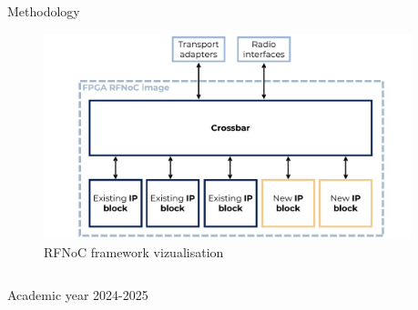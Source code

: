 \documentclass[final]{beamer}
\newlength{\sepwid}
\newlength{\onecolwid}
\begin{document}
\begin{frame}[t,fragile]
\begin{columns}[t]
\begin{column}{\onecolwid}
\begin{block}{Methodology}
    \begin{figure}[!ht]
      \centering
      \includegraphics[width=\linewidth]{img/RFNoC.pdf}
      \caption{RFNoC framework vizualisation}
    \end{figure}

  \end{block}
\end{column}

\begin{column}{\sepwid}\end{column} %


\end{columns} %
\vspace{-1.0in}
\begin{center}
   Academic year 2024-2025
\end{center}
\end{frame}
\end{document}
